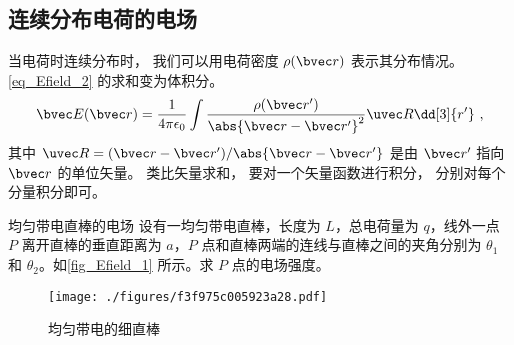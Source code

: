 \subsection{连续分布电荷的电场}
当电荷时连续分布时， 我们可以用电荷密度 $\rho(\bvec r)$ 表示其分布情况。 \autoref{eq_Efield_2} 的求和变为体积分。
\begin{equation}\label{eq_Efield_9}
\bvec E(\bvec r) = \frac{1}{4\pi\epsilon_0} \int \frac{\rho(\bvec r')}{\abs{\bvec r - \bvec r'}^2} \uvec R \dd[3]{r'}~,
\end{equation}
其中 $\uvec R = (\bvec r - \bvec r') / \abs{\bvec r - \bvec r'}$ 是由 $\bvec r'$ 指向 $\bvec r$ 的单位矢量。 类比矢量求和， 要对一个矢量函数进行积分， 分别对每个分量积分即可。

\begin{example}{均匀带电直棒的电场}\label{ex_Efield_1}
设有一均匀带电直棒，长度为 $L$，总电荷量为 $q$，线外一点 $P$ 离开直棒的垂直距离为 $a$，$P$ 点和直棒两端的连线与直棒之间的夹角分别为 $\theta_1$ 和 $\theta_2$。如\autoref{fig_Efield_1} 所示。求 $P$ 点的电场强度。
\begin{figure}[ht]
\centering
\texttt{[image: ./figures/f3f975c005923a28.pdf]}
\caption{均匀带电的细直棒} \label{fig_


}
\end{figure}


\end{example}
